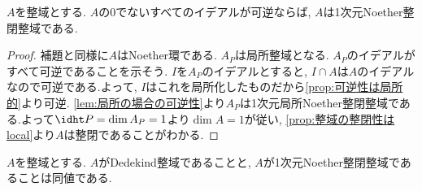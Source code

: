 \begin{prop}\label{prop:すべてのイデアルが可逆ならば1-dimNoether整閉整域}
	$A$を整域とする. $A$の0でないすべてのイデアルが可逆ならば, $A$は1次元Noether整閉整域である.
\end{prop}

\begin{proof}
	補題と同様に$A$はNoether環である. $A_P$は局所整域となる. $A_P$のイデアルがすべて可逆であることを示そう. $I$を$A_P$のイデアルとすると, $I\cap A$は$A$のイデアルなので可逆である.よって, $I$はこれを局所化したものだから\ref{prop:可逆性は局所的}より可逆. \ref{lem:局所の場合の可逆性}より$A_P$は1次元局所Noether整閉整域である.よって$\idht P=\dim A_P=1$より$\dim A=1$が従い, \ref{prop:整域の整閉性はlocal}より$A$は整閉であることがわかる.
\end{proof}

\begin{thm}\label{thm:Dedekind同値条件}
	$A$を整域とする. $A$がDedekind整域であることと, $A$が1次元Noether整閉整域であることは同値である.
\end{thm}

